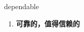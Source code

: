 
\begin{frame}
{\huge dependable}
\begin{center}
\begin{enumerate}\Large
  \item \textbf{可靠的，值得信赖的}
\end{enumerate}
\end{center}
\end{frame}
